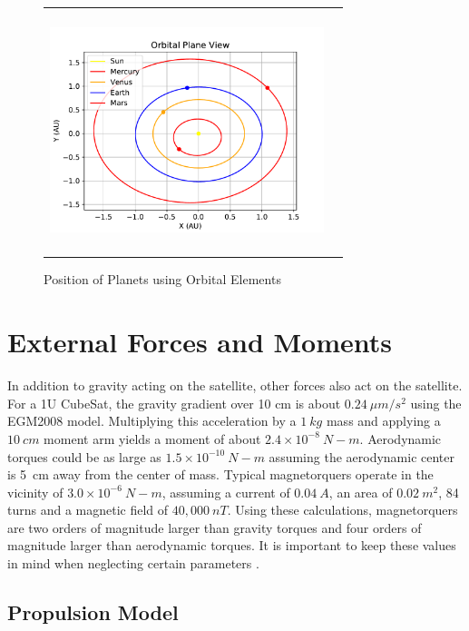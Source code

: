 \documentclass{article}
\begin{document}
\begin{figure}[H]
\begin{center}
\begin{tabular}{cc}
  \includegraphics[height=70mm, width=80mm]{Figures/inner_planets_top_down.pdf}\\
  \end{tabular}
  \end{center}
  \caption{Position of Planets using Orbital Elements}
\end{figure}

\section{External Forces and Moments}

In addition to gravity acting on the satellite, other forces also act
on the satellite. For a 1U CubeSat, the gravity gradient over 10 cm is about
$0.24~\mu m/s^2$ using the EGM2008 model. Multiplying this 
acceleration by a $1~kg$ mass and applying a $10~cm$ moment arm yields
a moment of about $2.4 \times 10^{-8}~N-m$. Aerodynamic torques could
be as large as $1.5 \times 10^{-10}~N-m$ assuming the aerodynamic
center is 5~cm away from the center of mass. Typical magnetorquers operate
in the vicinity of $3.0 \times 10^{-6}~N-m$, assuming a current of $0.04~A$, an area of
$0.02~m^2$, 84 turns and a magnetic field of $40,000~nT$. Using
these calculations, magnetorquers are two orders of magnitude
larger than gravity torques and four orders of magnitude larger than
aerodynamic torques. It is important to keep these values in mind when
neglecting certain parameters \cite{Radiation,AndersonD,Density_Model}.

\subsection{Propulsion Model}
\end{document}
